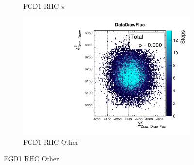 \begin{figure}[h]
\begin{subfigure}[t]{0.32\textwidth}
		\caption{FGD1 RHC $\pi$}
	\end{subfigure}
	\begin{subfigure}[t]{0.32\textwidth}
		\includegraphics[width=\textwidth, trim={20mm 6mm 4mm 11mm}, clip,page=133]{figures/mach3/2018/data/2018a_FixedCov_RedCov_Mpi_Data_merge_PostPredStore_FullLLH_procs}
		\caption{FGD1 RHC \numu Other}
	\end{subfigure}
	

\end{figure}
